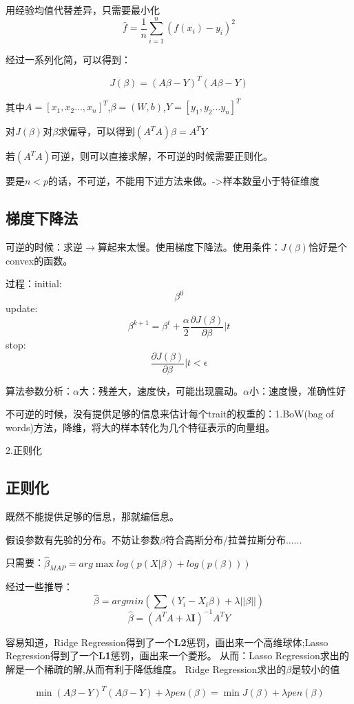 \documentclass[UTF8]{ctexart}
\begin{document}
用经验均值代替差异，只需要最小化$$\hat{f}=\frac{1}{n}\sum_{i=1}^n(f(x_i)-y_i)^2$$

经过一系列化简，可以得到：

$$J(\beta)=(A\beta-Y)^T(A\beta-Y)$$

其中$A=[x_1,x_2\dots,x_n]^T$,$\beta=(W,b)$,$Y=[y_1,y_2\dots y_n]^T$

对$J(\beta)$对$\beta$求偏导，可以得到$(A^TA)\beta=A^TY$

若$(A^TA)$可逆，则可以直接求解，不可逆的时候需要正则化。

要是$n<p$的话，不可逆，不能用下述方法来做。->样本数量小于特征维度

\subsection{梯度下降法}
可逆的时候：求逆$\rightarrow$算起来太慢。使用梯度下降法。使用条件：$J(\beta)$恰好是个convex的函数。

过程：initial:$$\beta^0$$
update:$$\beta^{k+1}=\beta^t+\frac{\alpha}{2}\frac{\partial J(\beta)}{\partial \beta}|t$$
stop:$$\frac{\partial J(\beta)}{\partial \beta}|t < \epsilon$$

算法参数分析：$\alpha$大：残差大，速度快，可能出现震动。$\alpha$小：速度慢，准确性好

不可逆的时候，没有提供足够的信息来估计每个trait的权重的：1.BoW(bag of words)方法，降维，将大的样本转化为几个特征表示的向量组。

2.正则化
\subsection{正则化}
既然不能提供足够的信息，那就编信息。

假设参数有先验的分布。不妨让参数$\beta$符合高斯分布/拉普拉斯分布......

只需要：$\hat{\beta}_{MAP}=arg\max log(p(X|\beta) + log(p(\beta)))$

经过一些推导：$$\hat\beta = argmin(\sum (Y_i - X_i\beta)+\lambda ||\beta||)$$
$$\hat\beta=(A^TA+\lambda \mathbf{I})^{-1}A^TY$$

容易知道，Ridge Regression得到了一个\textbf{L2}惩罚，画出来一个高维球体;Lasso Regression得到了一个\textbf{L1}惩罚，画出来一个菱形。
从而：Lasso Regression求出的解是一个稀疏的解,从而有利于降低维度。
Ridge Regression求出的$\beta$是较小的值

$$\min(A\beta - Y)^T(A\beta-Y)+\lambda pen(\beta)=\min J(\beta) + \lambda pen(\beta)$$
\end{document}
